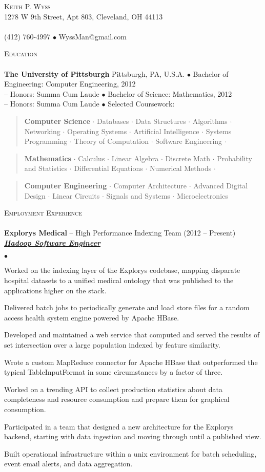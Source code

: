 \documentclass{article}
\newcommand{\area}[2]{\vspace*{-9pt} \begin{verse}\textbf{#1}   #2 \end{verse}  }
\newcommand{\lineunder}{\vspace*{-8pt} \\ \hspace*{-18pt} \hrulefill \\}
\newcommand{\header}[1]{{\hspace*{-15pt}\vspace*{6pt} \textsc{#1}} \vspace*{-6pt} \lineunder}
\newcommand{\employer}[4]{{ \textbf{#1} -- #2 (#3)\\ \underline{\textbf{\emph{#4}}}\\  }}
\newcommand{\contact}[3]{
  \vspace*{-24pt}
\begin{center}
{\LARGE \scshape {#1}}\\
#2 \lineunder 
#3
\end{center}
\vspace*{-8pt}
}
\newenvironment{achievements}{\begin{list}{$\bullet$}{\topsep 0pt \itemsep -2pt}}{\vspace*{4pt}\end{list}}
\begin{document}
\small
\smallskip
\vspace*{-22pt}

\contact{Keith P. Wyss}
{1278 W 9th Street, Apt 803, Cleveland, OH 44113}
{(412) 760-4997 $\bullet$ WyssMan@gmail.com }

\header{Education}
 \textbf{The University of Pittsburgh} Pittsburgh, PA, U.S.A. \newline%
 $\bullet$ Bachelor of Engineering: Computer Engineering, 2012\\ 
 \hspace{15pt}-- Honors: Summa Cum Laude \newline%
 $\bullet$ Bachelor of Science: Mathematics, 2012\\ 
 \hspace{15pt}-- Honors: Summa Cum Laude \newline%
 \vspace{7pt}
 $\bullet$  Selected Coursework:
\vspace{2pt}
\area{Computer Science}{$\cdot$ Databases $\cdot$ Data Structures %
$\cdot$ Algorithms $\cdot$ Networking $\cdot$ Operating Systems %
 $\cdot$ Artificial Intelligence $\cdot$ Systems Programming %
$\cdot$ Theory of Computation %
$\cdot$ Software Engineering $\cdot$}
\area{Mathematics}{$\cdot$ Calculus $\cdot$ Linear Algebra %
$\cdot$ Discrete Math $\cdot$ Probability and Statistics $\cdot$ Differential Equations %
$\cdot$ Numerical Methods $\cdot$ }
\area{Computer Engineering}{%
$\cdot$ Computer Architecture %
$\cdot$ Advanced Digital Design %
$\cdot$ Linear Circuits %
$\cdot$ Signals and Systems %
$\cdot$ Microelectronics %
}

\header{Employment Experience}
\employer{Explorys Medical}{High Performance Indexing Team} {2012 -- Present} %
{Hadoop Software Engineer}
\begin{achievements}
  \item Worked on the indexing layer of the Explorys codebase, mapping disparate hospital datasets to a unified medical ontology that was published to the applications higher on the stack.
  \item Delivered batch jobs to periodically generate and load store files for a random access health system engine powered by Apache HBase.
  \item Developed and maintained a web service that computed and served the results of set intersection over a large population indexed by feature similarity. 
      \item Wrote a custom MapReduce connector for Apache HBase that outperformed the typical TableInputFormat in some circumstances by a factor of three.
        \item Worked on a trending API to collect production statistics about data completeness and resource consumption and prepare them for graphical consumption.
          \item Participated in a team that designed a new architecture for the Explorys backend, starting with data ingestion and moving through until a published view.
            \item Built operational infrastructure within a unix environment for batch scheduling, event email alerts, and data aggregation.
            \end{achievements}
\end{document}
